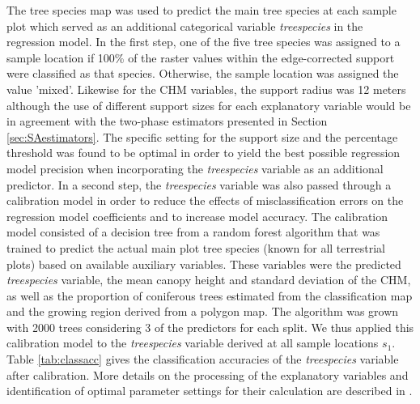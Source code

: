 \documentclass[remotesensing,article,submit,moreauthors,pdftex,10pt,a4paper]{mdpi}
\begin{document}
The tree species map was used to predict the main tree species at each sample plot which served as an additional categorical variable \textit{treespecies} in the regression model. In the first step, one of the five tree species was assigned to a sample location if 100\% of the raster values within the edge-corrected support were classified as that species. Otherwise, the sample location was assigned the value 'mixed'. Likewise for the CHM variables, the support radius was 12 meters although the use of different support sizes for each explanatory variable would be in agreement with the two-phase estimators presented in Section \ref{sec:SAestimators}. The specific setting for the support size and the percentage threshold was found to be optimal in order to yield the best possible regression model precision when incorporating the \textit{treespecies} variable as an additional predictor. In a second step, the \textit{treespecies} variable was also passed through a calibration model in order to reduce the effects of misclassification errors on the regression model coefficients and to increase model accuracy. The calibration model consisted of a decision tree from a random forest algorithm \citep{breiman2001} that was trained to predict the actual main plot tree species (known for all terrestrial plots) based on available auxiliary variables. These variables were the predicted \textit{treespecies} variable, the mean canopy height and standard deviation of the CHM, as well as the proportion of coniferous trees estimated from the classification map and the growing region derived from a polygon map. The algorithm was grown with 2000 trees considering 3 of the predictors for each split. We thus applied this calibration model to the \textit{treespecies} variable derived at all sample locations $s_1$. Table \ref{tab:classacc} gives the classification accuracies \citep{congalton2008} of the \textit{treespecies} variable after calibration. More details on the processing of the explanatory variables and identification of optimal parameter settings for their calculation are described in \citet{hill2017a}.
\end{document}
